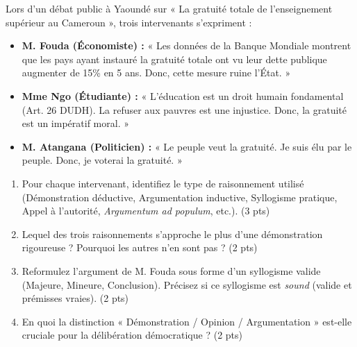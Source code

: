 \documentclass[11pt]{article}
\begin{document}
\begin{exercice}
Lors d'un débat public à Yaoundé sur « La gratuité totale de l'enseignement supérieur au Cameroun », trois intervenants s'expriment :
\begin{itemize}
    \item \textbf{M. Fouda (Économiste) :} « Les données de la Banque Mondiale montrent que les pays ayant instauré la gratuité totale ont vu leur dette publique augmenter de 15\% en 5 ans. Donc, cette mesure ruine l'État. »
    \item \textbf{Mme Ngo (Étudiante) :} « L'éducation est un droit humain fondamental (Art. 26 DUDH). La refuser aux pauvres est une injustice. Donc, la gratuité est un impératif moral. »
    \item \textbf{M. Atangana (Politicien) :} « Le peuple veut la gratuité. Je suis élu par le peuple. Donc, je voterai la gratuité. »
\end{itemize}
\begin{enumerate}
    \item Pour chaque intervenant, identifiez le type de raisonnement utilisé (Démonstration déductive, Argumentation inductive, Syllogisme pratique, Appel à l'autorité, \textit{Argumentum ad populum}, etc.). (3 pts)
    \item Lequel des trois raisonnements s'approche le plus d'une démonstration rigoureuse ? Pourquoi les autres n'en sont pas ? (2 pts)
    \item Reformulez l'argument de M. Fouda sous forme d'un syllogisme valide (Majeure, Mineure, Conclusion). Précisez si ce syllogisme est \textit{sound} (valide et prémisses vraies). (2 pts)
    \item En quoi la distinction « Démonstration / Opinion / Argumentation » est-elle cruciale pour la délibération démocratique ? (2 pts)
\end{enumerate}
\end{exercice}
\end{document}
